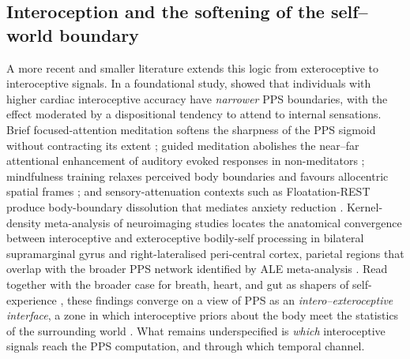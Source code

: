 \subsection{Interoception and the softening of the self--world boundary}


A more recent and smaller literature extends this logic from exteroceptive to interoceptive signals. In a foundational study, \citet{Ardizzi2018} showed that individuals with higher cardiac interoceptive accuracy have \emph{narrower} PPS boundaries, with the effect moderated by a dispositional tendency to attend to internal sensations. Brief focused-attention meditation softens the sharpness of the PPS sigmoid without contracting its extent \citep{Chiarella2024}; guided meditation abolishes the near--far attentional enhancement of auditory evoked responses in non-meditators \citep{nguyen_2020}; mindfulness training relaxes perceived body boundaries and favours allocentric spatial frames \citep{hanley_2020}; and sensory-attenuation contexts such as Floatation-REST produce body-boundary dissolution that mediates anxiety reduction \citep{hruby_2024}. Kernel-density meta-analysis of neuroimaging studies locates the anatomical convergence between interoceptive and exteroceptive bodily-self processing in bilateral supramarginal gyrus and right-lateralised peri-central cortex, parietal regions that overlap with the broader PPS network identified by ALE meta-analysis \citep{salvato_2020, Grivaz2017}. Read together with the broader case for breath, heart, and gut as shapers of self-experience \citep{seth2013interoceptive, barrett2016theory, Park2019, bogdanova_2021}, these findings converge on a view of PPS as an \emph{intero--exteroceptive interface}, a zone in which interoceptive priors about the body meet the statistics of the surrounding world \citep{salvato_2020, bogdanova_2021, noel_2021}. What remains underspecified is \emph{which} interoceptive signals reach the PPS computation, and through which temporal channel.


